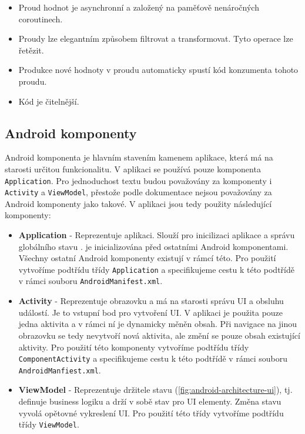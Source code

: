 \begin{itemize}
	\item Proud hodnot je asynchronní a založený na paměťově nenáročných coroutinech.
	
	\item Proudy lze elegantním způsobem filtrovat a transformovat. Tyto operace lze řetězit.
	
	\item Produkce nové hodnoty v proudu automaticky spustí kód konzumenta tohoto proudu.
	
	\item Kód je čitelnější.
\end{itemize}


\subsection *{Android komponenty}
Android komponenta \cite{android-component-application} je hlavním stavením kamenem aplikace, která má na starosti určitou funkcionalitu. V aplikaci se používá pouze komponenta \lstinline|Application|. Pro jednoduchost textu budou považovány za komponenty i \lstinline|Activity| a \lstinline|ViewModel|, přestože podle dokumentace nejsou považovány za Android komponenty jako takové. V aplikaci jsou tedy použity následující komponenty:

\begin{itemize}
	\item \textbf{Application} - Reprezentuje aplikaci. Slouží pro inicilizaci aplikace a správu globálního stavu \cite{android-component-application}. je inicializována před ostatními Android komponentami. Všechny ostatní Android komponenty existují v rámcí této. Pro použití vytvoříme podtřídu třídy \lstinline|Application| a specifikujeme cestu k této podtřídě v rámci souboru \lstinline|AndroidManifest.xml|.
	
	\item \textbf{Activity} - Reprezentuje obrazovku a má na starosti správu UI a obsluhu událostí. Je to vstupní bod pro vytvoření UI. V aplikaci je použita pouze jedna aktivita a v rámci ní je dynamicky měněn obsah. Při navigace na jinou obrazovku se tedy nevytvoří nová aktivita, ale změní se pouze obsah existující aktivity. Pro použití této komponenty vytvoříme podtřídu třídy \lstinline|ComponentActivity| a specifikujeme cestu k této podtřídě v rámci souboru \lstinline|AndroidManfiest.xml|.
	
	\item \textbf{ViewModel} - Reprezentuje držitele stavu (\ref{fig:android-architecture-ui}), tj. definuje business logiku a drží v sobě stav pro UI elementy. Změna stavu vyvolá opětovné vykreslení UI. Pro použití této třídy vytvoříme podtřídu třídy \lstinline|ViewModel|.
\end{itemize}

